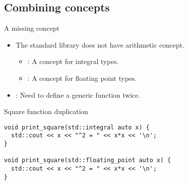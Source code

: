 \subsection{Combining concepts}

\begin{frame}[t,fragile]{A missing concept}
\begin{itemize}
  \item The standard library does not have arithmetic concept.
    \begin{itemize}
      \item {}: A concept for integral types.
      \item {}: A concept for floating point types.
    \end{itemize}

  \item {}: Need to define a generic function twice.
\end{itemize}


\begin{block}{Square function duplication}
\begin{lstlisting}
void print_square(std::integral auto x) {
  std::cout << x << "^2 = " << x*x << '\n';
}

void print_square(std::floating_point auto x) {
  std::cout << x << "^2 = " << x*x << '\n';
}
\end{lstlisting}
\end{block}
\end{frame}

